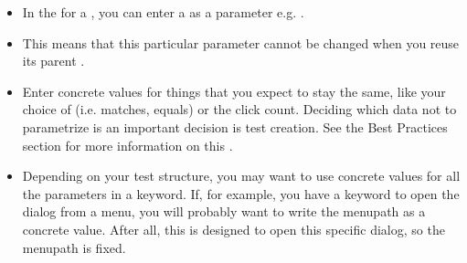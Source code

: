 
\begin{itemize}
\item In the \gdpropview{} for a \gdcase{}, you can enter a  as a parameter e.g. . 
\item This means that this particular parameter cannot be changed when you reuse its parent \gdcase{}. 
\item Enter concrete values for things that you expect to stay the same, like your choice of  (i.e. matches, equals) or the click count. Deciding which data not to parametrize is an important decision is test creation. See the Best Practices section for more information on this .
\item Depending on your test structure, you may want to use concrete values for all the parameters in a keyword. If, for example, you have a keyword to open the  dialog from a menu, you will probably want to write the menupath as a concrete value. After all, this \gdcase{} is designed to open this specific dialog, so the menupath is fixed. 
\end{itemize}
